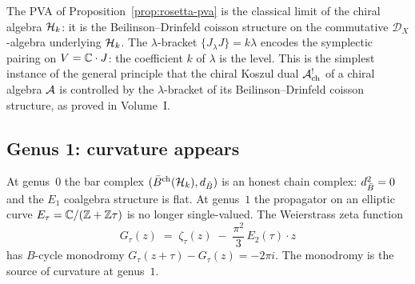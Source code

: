 
\begin{remark}
\label{rem:rosetta-coisson}
The PVA of Proposition~\ref{prop:rosetta-pva} is the classical
limit of the chiral algebra $\mathcal{H}_k$: it is the Beilinson--Drinfeld
coisson structure on the commutative $\mathcal{D}_X$-algebra
underlying $\mathcal{H}_k$. The $\lambda$-bracket $\{J_\lambda J\} = k\lambda$
encodes the symplectic pairing on $V = \mathbb{C} \cdot J$: the coefficient
$k$ of $\lambda$ is the level. This is the simplest
instance of the general principle that the chiral Koszul dual
$\mathcal{A}^!_{\mathrm{ch}}$ of a chiral algebra $\mathcal{A}$ is controlled by the
$\lambda$-bracket of its Beilinson--Drinfeld coisson structure,
as proved in Volume~I.
\end{remark}


\subsection{Genus 1: curvature appears}
\label{subsec:rosetta-genus1}

At genus~$0$ the bar complex $(\bar{B}^{\mathrm{ch}}(\mathcal{H}_k), d_{\bar{B}})$ is an honest chain complex: $d_{\bar{B}}^2 = 0$ and the $E_1$ coalgebra structure is flat. At genus~$1$ the propagator on an elliptic curve $E_\tau = \mathbb{C} / (\mathbb{Z} + \mathbb{Z}\tau)$ is no longer single-valued. The Weierstrass zeta function
\begin{equation}\label{eq:rosetta-elliptic-propagator}
G_\tau(z)
\;=\;
\zeta_\tau(z) \;-\; \frac{\pi^2}{3}\, E_2(\tau) \cdot z
\end{equation}
has $B$-cycle monodromy $G_\tau(z + \tau) - G_\tau(z) = -2\pi i$. The monodromy is the source of curvature at genus~$1$.

